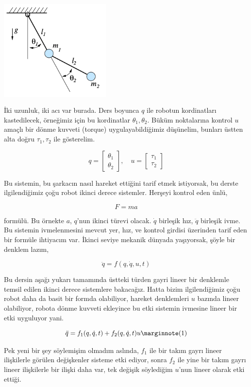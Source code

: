 \documentclass[12pt,fleqn]{article}\usepackage{../../common}
\begin{document}
\includegraphics[width=15em]{phy_control_1_01.png}

İki uzunluk, iki acı var burada. Ders boyunca $q$ ile robotun kordinatları
kastedilecek, örneğimiz için bu kordinatlar $\theta_1,\theta_2$. Büküm
noktalarına kontrol $u$ amaçlı bir dönme kuvveti (torque) uygulayabildiğimiz
düşünelim, bunları üstten alta doğru $\tau_1,\tau_2$ ile gösterelim.

$$
q = 
\left[\begin{array}{r}
\theta_1 \\
\theta_2
\end{array}\right], \quad
u = \left[\begin{array}{r}
\tau_1 \\
\tau_2
\end{array}\right]
$$

Bu sistemin, bu şarkacın nasıl hareket ettiğini tarif etmek istiyorsak, bu
derste ilgilendiğimiz çoğu robot ikinci derece sistemler. Herşeyi kontrol
eden ünlü,

$$
F = ma
$$

formülü. Bu örnekte $a$, $q$'nun ikinci türevi olacak. $\dot{q}$ birleşik
hız, $\ddot{q}$ birleşik ivme. Bu sistemin ivmelenmesini mevcut yer, hız,
ve kontrol girdisi üzerinden tarif eden bir formüle ihtiyacım var. İkinci
seviye mekanik dünyada yaşıyorsak, şöyle bir denklem lazım,

$$
\ddot{q} = f(q,\dot{q},u,t)
$$

Bu dersin aşağı yukarı tamamında üstteki türden gayri lineer bir denklemle
temsil edilen ikinci derece sistemlere bakacağız. Hatta bizim
ilgilendiğimiz çoğu robot daha da basit bir formda olabiliyor, hareket
denklemleri $u$ bazında lineer olabiliyor, robota dönme kuvveti ekleyince
bu etki sistemin ivmesine lineer bir etki uyguluyor yani.

$$
\ddot{q} = f_1 (q, \dot{q}, t) + f_2 (q, \dot{q}, t) u 
\mlabel{1}
$$

Pek yeni bir şey söylemişim olmadım aslında, $f_1$ ile bir takım gayrı
lineer ilişkilerle görülen değişkenler sisteme etki ediyor, sonra $f_2$ ile
yine bir takım gayrı lineer ilişkilerle bir ilişki daha var, tek değişik
söylediğim $u$'nun lineer olarak etki ettiği. 
\end{document}
